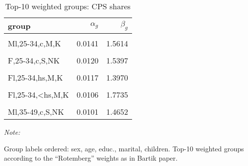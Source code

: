 \begin{table}

\caption{\label{tab:rotweights:cps}Top-10 weighted groups: CPS shares}
\centering
\begin{threeparttable}
\begin{tabular}[t]{lrr}
\toprule
group & $\alpha_g$ & $\beta_g$\\
\midrule
\cellcolor{gray!6}{Ml,35-49,c,M,K} & \cellcolor{gray!6}{0.0151} & \cellcolor{gray!6}{1.3824}\\
\addlinespace
Ml,25-34,c,M,K & 0.0141 & 1.5614\\
\addlinespace
\cellcolor{gray!6}{Fl,35-49,c,M,K} & \cellcolor{gray!6}{0.0124} & \cellcolor{gray!6}{1.5935}\\
\addlinespace
F,25-34,c,S,NK & 0.0120 & 1.5397\\
\addlinespace
\cellcolor{gray!6}{Ml,25-34,hs,M,K} & \cellcolor{gray!6}{0.0120} & \cellcolor{gray!6}{1.5080}\\
\addlinespace
Fl,25-34,hs,M,K & 0.0117 & 1.3970\\
\addlinespace
\cellcolor{gray!6}{Ml,25-34,hs,M,NK} & \cellcolor{gray!6}{0.0110} & \cellcolor{gray!6}{1.5619}\\
\addlinespace
Fl,25-34,<hs,M,K & 0.0106 & 1.7735\\
\addlinespace
\cellcolor{gray!6}{Ml,25-34,c,S,NK} & \cellcolor{gray!6}{0.0101} & \cellcolor{gray!6}{1.4090}\\
\addlinespace
Ml,35-49,c,S,NK & 0.0101 & 1.4652\\
\bottomrule
\end{tabular}
\begin{tablenotes}
\item \textit{Note: } 
\item Group labels ordered: sex, age, educ., marital, children. Top-10 weighted groups according to the ``Rotemberg'' weights as in Bartik paper.
\end{tablenotes}
\end{threeparttable}
\end{table}
